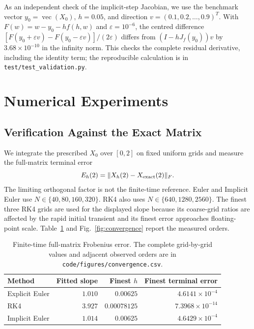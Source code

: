 \documentclass[11pt,a4paper]{article}
\theoremstyle{definition}
\theoremstyle{remark}
\begin{document}
As an independent check of the implicit-step Jacobian, we use the
benchmark vector $y_0=\operatorname{vec}(X_0)$, $h=0.05$, and direction
$v=(0.1,0.2,\ldots,0.9)^T$. With
$F(w)=w-y_0-hf(h,w)$ and $\varepsilon=10^{-6}$, the centred difference
$[F(y_0+\varepsilon v)-F(y_0-\varepsilon v)]/(2\varepsilon)$ differs
from $(I-hJ_f(y_0))v$ by $3.68\times10^{-10}$ in the infinity norm.
This checks the complete residual derivative, including the identity
term; the reproducible calculation is in
\texttt{test/test\_validation.py}.

\newpage
\section{Numerical Experiments}

\subsection{Verification Against the Exact Matrix}
We integrate the prescribed $X_0$ over $[0,2]$ on fixed uniform grids
and measure the full-matrix terminal error
\[
E_h(2)=\|X_h(2)-X_{\rm exact}(2)\|_F.
\]
The limiting orthogonal factor is not the finite-time reference.
Euler and Implicit Euler use $N\in\{40,80,160,320\}$.
RK4 also uses $N\in\{640,1280,2560\}$.
The finest three RK4 grids are used for the
displayed slope because its coarse-grid ratios are affected by the
rapid initial transient and its finest error approaches floating-point
scale. Table~\ref{tab:order_results} and
Fig.~\ref{fig:convergence} report the measured orders.

\begin{table}[htbp]
\centering
\begin{tabular}{lrrr}
\toprule
Method & Fitted slope & Finest $h$ & Finest terminal error \\
\midrule
Explicit Euler & $1.010$ & $0.00625$ & $4.6141\times10^{-4}$ \\
RK4 & $3.927$ & $0.00078125$ & $7.3968\times10^{-14}$ \\
Implicit Euler & $1.014$ & $0.00625$ & $4.6429\times10^{-4}$ \\
\bottomrule
\end{tabular}
\caption{Finite-time full-matrix Frobenius error. The complete
grid-by-grid values and adjacent observed orders are in
\texttt{code/figures/convergence.csv}.}
\label{tab:order_results}
\end{table}
\end{document}
